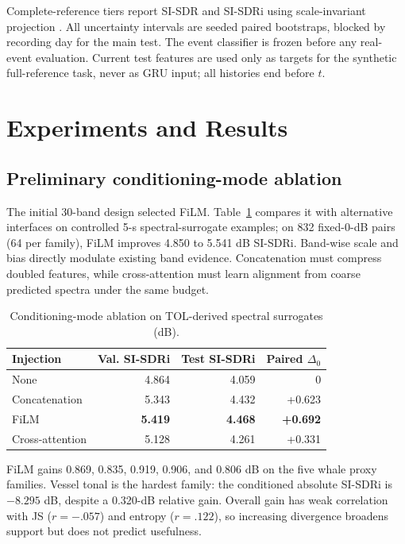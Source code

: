 \documentclass[conference]{IEEEtran}
\begin{document}
Complete-reference tiers report SI-SDR and SI-SDRi using scale-invariant
projection \cite{vincent2006sdr,leroux2019sdr}.  All uncertainty intervals are
seeded paired bootstraps, blocked by recording day for the main test.  The event classifier is frozen before any real-event
evaluation.  Current test features are used only as targets for the synthetic
full-reference task, never as GRU input; all histories end before $t$.

\section{Experiments and Results}
\subsection{Preliminary conditioning-mode ablation}
The initial 30-band design selected FiLM.  Table~\ref{tab:ablation} compares
it with alternative interfaces on controlled 5-s spectral-surrogate
examples; on 832 fixed-0-dB pairs (64 per family), FiLM improves 4.850 to
5.541 dB SI-SDRi.  Band-wise scale and bias directly modulate existing band
evidence.  Concatenation must compress doubled features, while cross-attention
must learn alignment from coarse predicted spectra under the same budget.

\begin{table}[t]
\caption{Conditioning-mode ablation on TOL-derived spectral surrogates (dB).}
\label{tab:ablation}\centering\footnotesize
\begin{tabular}{lrrr}
\toprule
Injection & Val. SI-SDRi & Test SI-SDRi & Paired $\Delta_0$\\
\midrule
None &4.864&4.059&0\\
Concatenation &5.343&4.432&+0.623\\
FiLM &\textbf{5.419}&\textbf{4.468}&\textbf{+0.692}\\
Cross-attention &5.128&4.261&+0.331\\
\bottomrule
\end{tabular}
\end{table}

FiLM gains 0.869, 0.835, 0.919, 0.906, and 0.806 dB on the five whale proxy
families.  Vessel tonal is the hardest family: the conditioned absolute
SI-SDRi is $-8.295$ dB, despite a 0.320-dB relative gain.  Overall gain has
weak correlation with JS ($r=-.057$) and entropy ($r=.122$), so increasing
divergence broadens support but does not predict usefulness.
\end{document}
